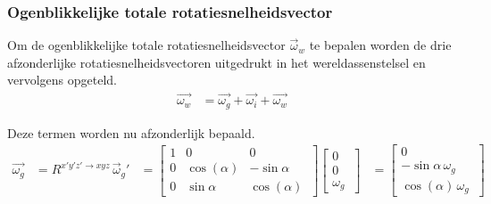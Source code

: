 \subsubsection{Ogenblikkelijke totale rotatiesnelheidsvector}
Om de ogenblikkelijke totale rotatiesnelheidsvector $\overrightarrow{\omega}_{w}$ te bepalen worden de drie afzonderlijke rotatiesnelheidsvectoren uitgedrukt in het wereldassenstelsel en vervolgens opgeteld.
\begin{equation*}
\begin{split}
\overrightarrow{\omega_{w}}
&=\overrightarrow{\omega_{g}}+\overrightarrow{\omega_{i}}+\overrightarrow{\omega_{w}}
\end{split}
\end{equation*}



Deze termen worden nu afzonderlijk bepaald.
\begin{equation*}
\begin{split}
\overrightarrow{\omega_{g}}
&=R^{x'y'z' \rightarrow xyz}\,\overrightarrow{\omega}_{g}'
&=	  \begin{bmatrix}
      1 & 0 & 0\\
      0 & \cos(\alpha) & -\sin{\alpha}\\ 
      0 & \sin{\alpha} & \cos(\alpha)\
      \end{bmatrix}
      \begin{bmatrix}
      0\\
      0\\
      \omega_{g}\
      \end{bmatrix}     
&=	  \begin{bmatrix}
      0\\
      -\sin{\alpha}\,\omega_{g}\\
      \cos(\alpha)\,\omega_{g}\
      \end{bmatrix}
\end{split}
\end{equation*}

